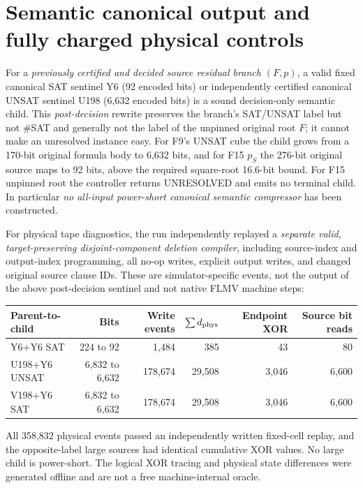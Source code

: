 \documentclass[11pt]{article}
\begin{document}
\section{Semantic canonical output and fully charged physical controls}
For a \emph{previously certified and decided source residual branch $(F,p)$}, a valid fixed canonical SAT sentinel Y6 (92 encoded bits) or independently certified canonical UNSAT sentinel U198 (6,632 encoded bits) is a sound decision-only semantic child. This \emph{post-decision} rewrite preserves the branch's SAT/UNSAT label but not $\#$SAT and generally not the label of the unpinned original root $F$; it cannot make an unresolved instance easy. For F9's UNSAT cube the child grows from a 170-bit original formula body to 6,632 bits, and for F15 $p_S$ the 276-bit original source maps to 92 bits, above the required square-root 16.6-bit bound. For F15 unpinned root the controller returns UNRESOLVED and emits no terminal child. In particular \emph{no all-input power-short canonical semantic compressor} has been constructed.

For physical tape diagnostics, the run independently replayed a \emph{separate valid, target-preserving disjoint-component deletion compiler}, including source-index and output-index programming, all no-op writes, explicit output writes, and changed original source clause IDs. These are simulator-specific events, not the output of the above post-decision sentinel and not native FLMV machine steps:
\begin{center}\begin{tabular}{lrrrrr}\toprule
Parent-to-child&Bits&Write events&$\sum d_{\rm phys}$&Endpoint XOR&Source bit reads\\\midrule
Y6+Y6 SAT&224 to 92&1,484&385&43&80\\
U198+Y6 UNSAT&6,832 to 6,632&178,674&29,508&3,046&6,600\\
V198+Y6 SAT&6,832 to 6,632&178,674&29,508&3,046&6,600\\\bottomrule
\end{tabular}\end{center}
All 358,832 physical events passed an independently written fixed-cell replay, and the opposite-label large sources had identical cumulative XOR values. No large child is power-short. The logical XOR tracing and physical state differences were generated offline and are not a free machine-internal oracle.
\end{document}
